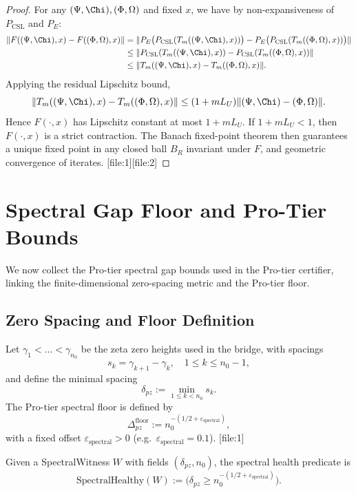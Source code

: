 \documentclass[11pt]{article}
\begin{document}
\begin{proof}
For any $(\Psi,\Chi),(\Phi,\Omega)$ and fixed $x$, we have by non-expansiveness
of $P_{\mathrm{CSL}}$ and $P_E$:
\begin{align*}
 \|F((\Psi,\Chi),x) - F((\Phi,\Omega),x)\|
 &= \|P_E\bigl(P_{\mathrm{CSL}}(T_m((\Psi,\Chi),x))\bigr)
      - P_E\bigl(P_{\mathrm{CSL}}(T_m((\Phi,\Omega),x))\bigr)\|\\
 &\le \|P_{\mathrm{CSL}}(T_m((\Psi,\Chi),x))
        - P_{\mathrm{CSL}}(T_m((\Phi,\Omega),x))\|\\
 &\le \|T_m((\Psi,\Chi),x) - T_m((\Phi,\Omega),x)\|.
\end{align*}
Applying the residual Lipschitz bound,
\[
  \|T_m((\Psi,\Chi),x) - T_m((\Phi,\Omega),x)\|
  \le (1 + m L_U)\|(\Psi,\Chi) - (\Phi,\Omega)\|.
\]
Hence $F(\cdot,x)$ has Lipschitz constant at most $1 + m L_U$. If
$1 + m L_U < 1$, then $F(\cdot,x)$ is a strict contraction. The
Banach fixed-point theorem then guarantees a unique fixed point in any
closed ball $B_R$ invariant under $F$, and geometric convergence of
iterates.%
[file:1][file:2]
\end{proof}

\section{Spectral Gap Floor and Pro-Tier Bounds}

We now collect the Pro-tier spectral gap bounds used in the Pro-tier
certifier, linking the finite-dimensional zero-spacing metric and the
Pro-tier floor.

\subsection{Zero Spacing and Floor Definition}

Let $\gamma_1 < \dots < \gamma_{n_0}$ be the zeta zero heights used in
the bridge, with spacings
\[
  s_k = \gamma_{k+1} - \gamma_k,\quad
  1 \le k \le n_0 - 1,
\]
and define the minimal spacing
\[
  \delta_{pz} := \min_{1 \le k < n_0} s_k.
\]
The Pro-tier spectral floor is defined by
\[
  \Delta_{pz}^{\mathrm{floor}}
  := n_0^{-(1/2 + \varepsilon_{\mathrm{spectral}})},
\]
with a fixed offset $\varepsilon_{\mathrm{spectral}} > 0$ (e.g.\
$\varepsilon_{\mathrm{spectral}} = 0.1$).%
[file:1]

\begin{definition}
Given a SpectralWitness $W$ with fields $(\delta_{pz}, n_0)$, the
spectral health predicate is
\[
  \mathrm{SpectralHealthy}(W)
  :=
  \bigl(\delta_{pz} \ge n_0^{-(1/2 + \varepsilon_{\mathrm{spectral}})}\bigr).
\]
\end{definition}
\end{document}
